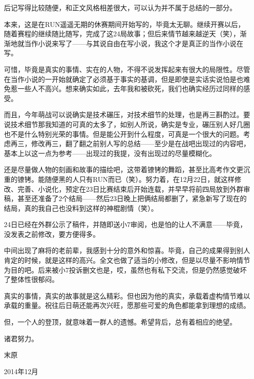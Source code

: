 后记写得比较随便，和正文风格相差很大，可以认为并不属于总结的一部分。

本来，这是在RUN遥遥无期的休赛期间开始写的，毕竟太无聊。继续开赛以后，随着赛程的继续随比随写，完成了这24局故事；但后来情节越来越逆天（笑），渐渐地就当作小说来写了——与其说自由在写小说，我这个才是真正的当作小说在写。

可惜，毕竟是真实的事情、实在的人物，不得不说发挥起来有很大的局限性。尽管在当作小说的一开始就确定了必须基于事实的基调，但是即使是实话实说怕是也难免惹一些人不高兴。想来确实如此，去年我和被砍死，我们也确实经历过同样的感受。

而且，今年萌战可以说确实是技术碾压，对技术细节的处理，也是再三斟酌过。要说技术细节那我知道的可真的太多了，如别人所说，确实是专业，碾压别人好几圈也不是什么特别光荣的事情。但是能公开到什么程度，可真是一个很大的问题。考虑再三，修改再三，翻了翻之前别人写的总结——至少是在战吧出现过的内容吧，基本上以这一点为参考——出现过的我提，没有出现过的尽量模糊化。

还是尽量做人物的刻画和故事的描绘吧，这带着镣铐的舞蹈，甚至比高考作文更沉重的镣铐。能随便黑的人只有RUN而已（笑）。努力着，在12月22日，就这样修改、完善、小说化，预定在23日比赛结束后开始连载，并早早将前四局放到外群审稿，甚至还准备了2个结局——然后23日晚上把俩结局都删了，紧急新写了现在的结局，真的我自己也没料到这样的神棍剧情（笑）。

24日已经在外群公示了稿件，并随即送小7审阅，也是怕的让人不满意——毕竟，没发表之前修改，要方便得多。

中间出现了麻将的老前辈，我感到十分的意外和惊喜。毕竟，自己的成果得到别人肯定的时候，就是这样的高兴。全文也做了适当的小修改，但是以尽量不影响情节为目的吧。后来被小7投诉删文也是，哎，虽然也有私下交流，但是仍然感觉破坏了整体性很郁闷。

真实的事情，真实的故事就是这么精彩。但也因为他的真实，承载着虚构情节难以承载的重量。祝往后日萌还能再次兴旺，愿那些可爱的角色都能拿到理想的成绩。

但，一个人的登顶，就意味着一群人的遗憾。希望背后，总有着相应的绝望。

诸君努力。

\begin{flushright}
  \rm\kai 末原

  2014年12月
\end{flushright}
